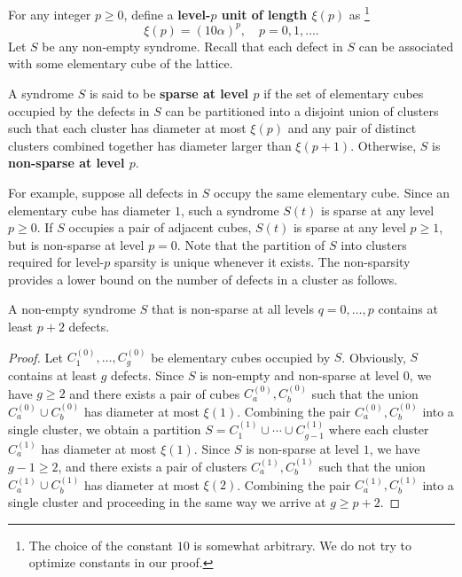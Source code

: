 For any integer $p\ge 0$, define a {\bf level-$p$ unit of length $\xi(p)$} as%
\footnote{The choice of the constant $10$ is somewhat arbitrary.
We do not try to optimize constants in our proof.}
\begin{equation}
\xi(p)=(10\alpha)^p, \quad p=0,1,\ldots.
\end{equation}
Let $S$ be any non-empty syndrome.
Recall that each defect in $S$ can be associated with some elementary cube of the lattice.
\begin{defn}
\label{defn:psparse}
A syndrome $S$ is said to be {\bf sparse at level $p$} 
if the set of elementary cubes occupied by the defects in $S$
can be partitioned into a disjoint union of clusters
such that each cluster has diameter at most $\xi(p)$
and any pair of distinct clusters combined together has diameter larger
than $\xi(p+1)$. Otherwise, $S$ is {\bf non-sparse at level $p$}.
\end{defn}
\noindent
For example, suppose all defects in $S$ occupy the same elementary cube.
Since an elementary cube has diameter $1$, such a syndrome $S(t)$ is sparse at any level $p \ge 0$.
If $S$ occupies a pair of adjacent cubes, $S(t)$ is sparse at any level $p\ge 1$,
but is non-sparse at level $p=0$.
Note that the partition of $S$ into clusters required for level-$p$ sparsity
is unique whenever it exists.
The non-sparsity provides a lower bound on the number of defects in a cluster
as follows.
\begin{lem}
\label{lemma:counting}
A non-empty syndrome $S$ that is non-sparse at all levels $q=0,\ldots,p$
contains at least $p+2$ defects.
\end{lem}
\begin{proof}
Let $C^{(0)}_1,\ldots, C^{(0)}_g$ be elementary cubes occupied by $S$.
Obviously, $S$ contains at least $g$ defects.
Since $S$ is non-empty and non-sparse at level $0$,
we have $g \ge 2$ and there exists
a pair of cubes $C_a^{(0)}, C_b^{(0)}$ such that the union
$C_a^{(0)} \cup C_b^{(0)}$ has diameter at most $\xi(1)$.
Combining the pair $C_a^{(0)}, C_b^{(0)}$  into a single cluster,
we obtain a partition $S = C_1^{(1)} \cup \cdots \cup C_{g-1}^{(1)}$
where each cluster $C_a^{(1)}$ has diameter at most $\xi(1)$.
Since $S$ is non-sparse at level $1$, we have $g-1 \ge 2$,
and there exists a pair of clusters $C_a^{(1)}, C_b^{(1)}$ such that the union
$C_a^{(1)}\cup C_b^{(1)}$ has diameter at most $\xi(2)$.
Combining the pair $C_a^{(1)}, C_b^{(1)}$ into a single cluster and
proceeding in the same way we arrive at $g \ge p+2$.
\end{proof}

